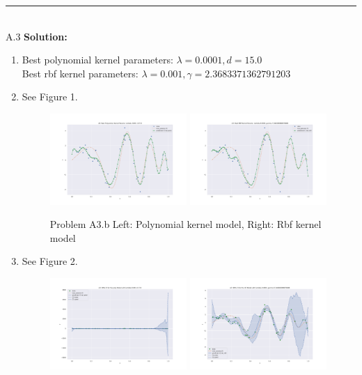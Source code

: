 \documentclass{article}
\newcommand{\1}{\mathbf{1}}
\begin{document}
\noindent\rule{\textwidth}{1pt}
\\
A.3 {\bf Solution:}\\
\begin{enumerate}
    \item Best polynomial kernel parameters: $\lambda = 0.0001, d=15.0$\\
    Best rbf kernel parameters: $\lambda = 0.001, \gamma = 2.3683371362791203$
    \item See Figure 1.
        \begin{figure}[h!]
            \centering
            \includegraphics[width=0.49\textwidth]{hw3/code/figures/A3b_poly.pdf}
            \includegraphics[width=0.49\textwidth]{hw3/code/figures/A3b_rbf.pdf}
            \caption{Problem A3.b Left: Polynomial kernel model, Right: Rbf kernel model}
            \label{figure:a4}
        \end{figure}
    \item See Figure 2.
        \begin{figure}[h!]
            \centering
            \includegraphics[width=0.49\textwidth]{hw3/code/figures/A3c_poly.pdf}
            \includegraphics[width=0.49\textwidth]{hw3/code/figures/A3c_rbf.pdf}

\end{figure}
\end{enumerate}
\end{document}

